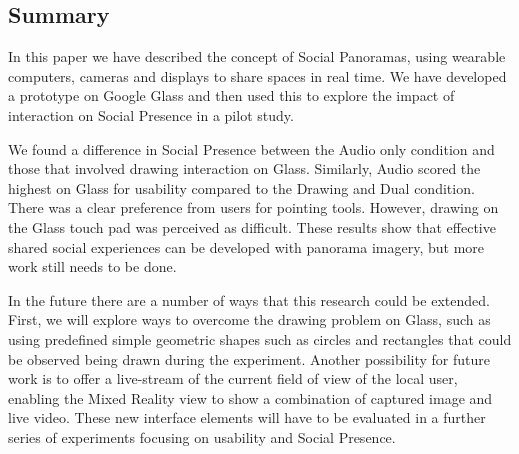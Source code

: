 \subsection{Summary}

In this paper we have described the concept of Social Panoramas, using wearable computers, cameras and displays to share spaces in real time. We have developed a prototype on Google Glass and then used this to explore the impact of interaction on Social Presence in a pilot study. 

We found a difference in Social Presence between the Audio only condition and those that involved drawing interaction on Glass. Similarly, Audio scored the highest on Glass for usability compared to the Drawing and Dual condition. There was a clear preference from users for pointing tools. However, drawing on the Glass touch pad was perceived as difficult. These results show that effective shared social experiences can be developed with panorama imagery, but more work still needs to be done.

In the future there are a number of ways that this research could be extended. First, we will explore ways to overcome the drawing problem on Glass, such as using predefined simple geometric shapes such as circles and rectangles that could be observed being drawn during the experiment. Another possibility for future work is to offer a live-stream of the current field of view of the local user, enabling the Mixed Reality view to show a combination of captured image and live video. These new interface elements will have to be evaluated in a further series of experiments focusing on usability and Social Presence.

